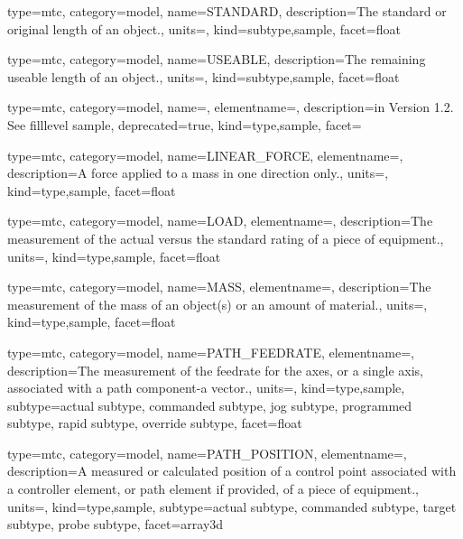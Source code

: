 {
  type=mtc,
  category=model,
  name={STANDARD},
  description={The standard or original length of an object.},
  units=,
  kind={subtype,sample},
  facet={\gls{float}}
}


{
  type=mtc,
  category=model,
  name={USEABLE},
  description={The remaining useable length of an object.},
  units=,
  kind={subtype,sample},
  facet={\gls{float}}
}


{
  type=mtc,
  category=model,
  name=,
  elementname=,
  description={\DEPRECATED in Version 1.2.  See \gls{filllevel sample}},
  deprecated={true},
  kind={type,sample},
  facet={}
}


{
  type=mtc,
  category=model,
  name={LINEAR\_FORCE},
  elementname=,
  description={A \gls{force} applied to a mass in one direction only.},
  units=,
  kind={type,sample},
  facet={\gls{float}}
}


{
  type=mtc,
  category=model,
  name={LOAD},
  elementname=,
  description={The measurement of the actual versus the standard rating of a piece of equipment.},
  units=,
  kind={type,sample},
  facet={\gls{float}}
}


{
  type=mtc,
  category=model,
  name={MASS},
  elementname=,
  description={The measurement of the mass of an object(s) or an amount of material.},
  units=,
  kind={type,sample},
  facet={\gls{float}}
}


{
  type=mtc,
  category=model,
  name={PATH\_FEEDRATE},
  elementname=,
  description={The measurement of the feedrate for the axes, or a single axis, associated with a \gls{path} component-a vector.},
  units=,
  kind={type,sample},
  subtype={\gls{actual subtype}, \gls{commanded subtype}, \gls{jog subtype}, \gls{programmed subtype}, \gls{rapid subtype}, \gls{override subtype}},
  facet={\gls{float}}
}





{
  type=mtc,
  category=model,
  name={PATH\_POSITION},
  elementname=,
  description={A measured or calculated position of a control point associated with a \gls{controller} element, or \gls{path} element if provided, of a piece of equipment.},
  units=,
  kind={type,sample},
  subtype={\gls{actual subtype}, \gls{commanded subtype}, \gls{target subtype}, \gls{probe subtype}},
  facet={\gls{array3d}}
}



